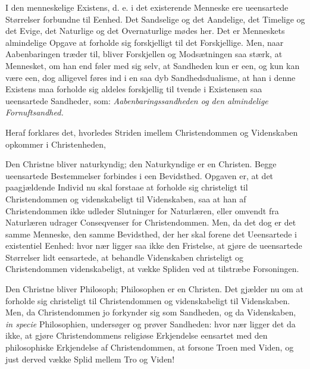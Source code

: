 \documentclass[12pt,a4paper]{book}
\newcommand{\opage}[1]{\marginnote{\footnotesize\textit{[#1]}}}
\begin{document}
I den menneskelige Existens, d. e. i det existerende Menneske ere
ueensartede Størrelser forbundne til Eenhed. Det Sandselige og det
Aandelige, det Timelige og det Evige, det Naturlige og det Overnaturlige
mødes her. Det er Menneskets almindelige Opgave at forholde sig
forskjelligt til det Forskjellige. Men, naar Aabenbaringen træder til,
bliver Forskjellen og Modsætningen saa stærk, at Mennesket, om han end
føler med sig selv, at Sandheden kun er een, og kun kan være een, dog
alligevel føres ind i en saa dyb Sandhedsdualisme, at han i denne
Existens maa forholde sig aldeles forskjellig til tvende i Existensen saa
ueensartede Sandheder, som: \emph{Aabenbaringssandheden og den
almindelige Fornuftsandhed.}

Heraf forklares det, hvorledes Striden imellem Christendommen og
Videnskaben opkommer i Christenheden,

\opage{8} Den Christne bliver naturkyndig; den Naturkyndige er en Christen. Begge
ueensartede Bestemmelser forbindes i een Bevidsthed. Opgaven er, at det
paagjældende Individ nu skal forstaae at forholde sig christeligt til
Christendommen og videnskabeligt til Videnskaben, saa at han af
Christendommen ikke udleder Slutninger for Naturlæren, eller omvendt fra
Naturlæren udrager Conseqvenser for Christendommen. Men, da det dog er
det samme Menneske, den samme Bevidsthed, der her skal forene det
Ueensartede i existentiel Eenhed: hvor nær ligger saa ikke den Fristelse,
at gjøre de ueensartede Størrelser lidt eensartede, at behandle
Videnskaben christeligt og Christendommen videnskabeligt, at vække
Spliden ved at tilstræbe Forsoningen.

Den Christne bliver Philosoph; Philosophen er en Christen. Det gjælder
nu om at forholde sig christeligt til Christendommen og videnskabeligt
til Videnskaben. Men, da Christendommen jo forkynder sig som Sandheden,
og da Videnskaben, \textit{in specie} Philosophien, undersøger og prøver
Sandheden: hvor nær ligger det da ikke, at gjøre Christendommens
religiøse Erkjendelse eensartet med den philosophiske Erkjendelse af
Christendommen, at forsone Troen med Viden, og just derved vække Splid
mellem Tro og Viden!
\end{document}

